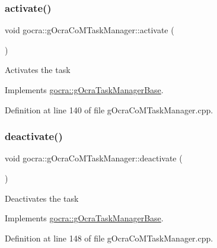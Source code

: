 \subsubsection{\texorpdfstring{activate()}{activate()}}
{\footnotesize\ttfamily void gocra\+::g\+Ocra\+Co\+M\+Task\+Manager\+::activate (\begin{DoxyParamCaption}{ }\end{DoxyParamCaption})\hspace{0.3cm}{\ttfamily [virtual]}}

Activates the task 

Implements \hyperlink{classgocra_1_1gOcraTaskManagerBase_a50cf1c408749d6e9dcfaf50bcab77dee}{gocra\+::g\+Ocra\+Task\+Manager\+Base}.



Definition at line 140 of file g\+Ocra\+Co\+M\+Task\+Manager.\+cpp.

\hypertarget{classgocra_1_1gOcraCoMTaskManager_aec4b5fefd71eabb7ec71d0801a5bbf5f}{}\label{classgocra_1_1gOcraCoMTaskManager_aec4b5fefd71eabb7ec71d0801a5bbf5f} 
\subsubsection{\texorpdfstring{deactivate()}{deactivate()}}
{\footnotesize\ttfamily void gocra\+::g\+Ocra\+Co\+M\+Task\+Manager\+::deactivate (\begin{DoxyParamCaption}{ }\end{DoxyParamCaption})\hspace{0.3cm}{\ttfamily [virtual]}}

Deactivates the task 

Implements \hyperlink{classgocra_1_1gOcraTaskManagerBase_a7cf9111e69aee47a39fe0f2976a20d6c}{gocra\+::g\+Ocra\+Task\+Manager\+Base}.



Definition at line 148 of file g\+Ocra\+Co\+M\+Task\+Manager.\+cpp.

\hypertarget{classgocra_1_1gOcraCoMTaskManager_a9df173026478a08d1afa64f32fab2c01}{}\label{classgocra_1_1gOcraCoMTaskManager_a9df173026478a08d1afa64f32fab2c01} 
